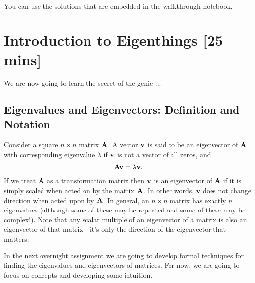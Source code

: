 \begin{sol}
You can use the solutions that are embedded in the walkthrough notebook.
\end{sol}

\section{Introduction to Eigenthings [25 mins]}

We are now going to learn the secret of the genie ...

\subsection{Eigenvalues and Eigenvectors: Definition and Notation}

Consider a square $n\times n$ matrix $\mathbf{A}$. A vector $\mathbf{v}$ is said to be an eigenvector of $\mathbf{A}$ with corresponding eigenvalue $\lambda$ if $\mathbf{v}$ is not a vector of all zeros, and
\begin{align}
\mathbf{A} \mathbf{v} = \lambda \mathbf{v}. 
\label{eqn:EvalDef}
\end{align}
If we treat $\mathbf{A}$ as a transformation matrix then  $\mathbf{v}$ is an eigenvector of $\mathbf{A}$ if it is simply scaled when acted on by the matrix $\mathbf{A}$. In other words,  $\mathbf{v}$ does not change direction when acted upon by $\mathbf{A}$. In general, an $n\times n$ matrix has exactly $n$ eigenvalues (although some of these may be repeated and some of these may be complex!). Note that any scalar multiple of an eigenvector of a matrix is also an eigenvector of that matrix - it's only the direction of the eigenvector that matters.

In the next overnight assignment we are going to develop formal techniques for finding the eigenvalues and eigenvectors of matrices. For now, we are going to focus on concepts and developing some intuition.

